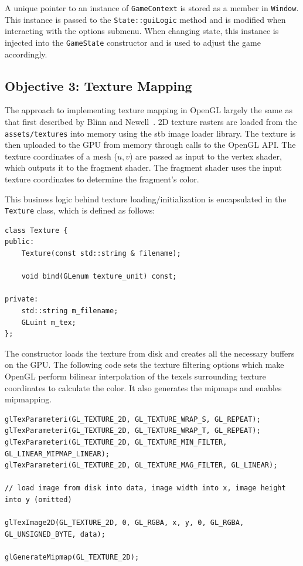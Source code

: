 \documentclass {article}
\begin{document}
A unique pointer to an instance of \texttt{GameContext} is stored as a member in \texttt{Window}. This instance is passed to the \texttt{State::guiLogic} method and is modified when interacting with the options submenu. When changing state, this instance is injected into the \texttt{GameState} constructor and is used to adjust the game accordingly.

\subsection{Objective 3: Texture Mapping}
The approach to implementing texture mapping in OpenGL largely the same as that first described by Blinn and Newell~\cite{texture}. 2D texture rasters are loaded from the \texttt{assets/textures} into memory using the stb image loader library. The texture is then uploaded to the GPU from memory through calls to the OpenGL API. The texture coordinates of a mesh ($u, v$) are passed as input to the vertex shader, which outputs it to the fragment shader. The fragment shader uses the input texture coordinates to determine the fragment's color.


This business logic behind texture loading/initialization is encapsulated in the \texttt{Texture} class, which is defined as follows:
\begin{verbatim}
class Texture {
public:
    Texture(const std::string & filename);

    void bind(GLenum texture_unit) const;

private:
    std::string m_filename;
    GLuint m_tex;
};
\end{verbatim}

The constructor loads the texture from disk and creates all the necessary buffers on the GPU. The following code sets the texture filtering options which make OpenGL perform bilinear interpolation of the texels surrounding texture coordinates to calculate the color. It also generates the mipmaps and enables mipmapping.
\begin{verbatim}
glTexParameteri(GL_TEXTURE_2D, GL_TEXTURE_WRAP_S, GL_REPEAT);
glTexParameteri(GL_TEXTURE_2D, GL_TEXTURE_WRAP_T, GL_REPEAT);
glTexParameteri(GL_TEXTURE_2D, GL_TEXTURE_MIN_FILTER, GL_LINEAR_MIPMAP_LINEAR);
glTexParameteri(GL_TEXTURE_2D, GL_TEXTURE_MAG_FILTER, GL_LINEAR);

// load image from disk into data, image width into x, image height into y (omitted)

glTexImage2D(GL_TEXTURE_2D, 0, GL_RGBA, x, y, 0, GL_RGBA, GL_UNSIGNED_BYTE, data);

glGenerateMipmap(GL_TEXTURE_2D);
\end{verbatim}
\end{document}
